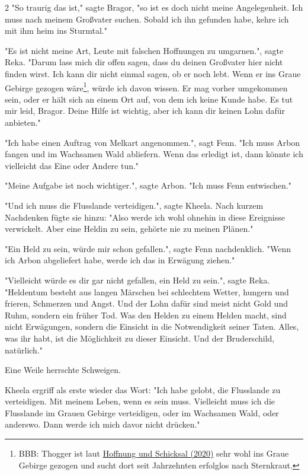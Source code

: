 \documentclass[10pt, a4paper, oneside]{book}
\begin{document}
\begin{multicols}{2}
"So traurig das ist," sagte Bragor, "so ist es doch nicht meine Angelegenheit. Ich muss nach meinem Großvater suchen. Sobald ich ihn gefunden habe, kehre ich mit ihm heim ins Sturmtal." 

"Es ist nicht meine Art, Leute mit falschen Hoffnungen zu umgarnen.", sagte Reka. "Darum lass mich dir offen sagen, dass du deinen Großvater hier nicht finden wirst. Ich kann dir nicht einmal sagen, ob er noch lebt. Wenn er ins Graue Gebirge gezogen wäre\footnote{BBB: Thogger ist laut \hyperref[storytext-2020-hoffnung-und-schicksal]{Hoffnung und Schicksal (2020)} sehr wohl ins Graue Gebirge gezogen und sucht dort seit Jahrzehnten erfolglos nach Sternkraut.}, würde ich davon wissen. Er mag vorher umgekommen sein, oder er hält sich an einem Ort auf, von dem ich keine Kunde habe. Es tut mir leid, Bragor. Deine Hilfe ist wichtig, aber ich kann dir keinen Lohn dafür anbieten." 

"Ich habe einen Auftrag von Melkart angenommen.", sagt Fenn. "Ich muss Arbon fangen und im Wachsamen Wald abliefern. Wenn das erledigt ist, dann könnte ich vielleicht das Eine oder Andere tun." 

"Meine Aufgabe ist noch wichtiger.", sagte Arbon. "Ich muss Fenn entwischen." 

"Und ich muss die Flusslande verteidigen.", sagte Kheela. Nach kurzem Nachdenken fügte sie hinzu: "Also werde ich wohl ohnehin in diese Ereignisse verwickelt. Aber eine Heldin zu sein, gehörte nie zu meinen Plänen." 

"Ein Held zu sein, würde mir schon gefallen.", sagte Fenn nachdenklich. "Wenn ich Arbon abgeliefert habe, werde ich das in Erwägung ziehen." 

"Vielleicht würde es dir gar nicht gefallen, ein Held zu sein.", sagte Reka. "Heldentum besteht aus langen Märschen bei schlechtem Wetter, hungern und frieren, Schmerzen und Angst. Und der Lohn dafür sind meist nicht Gold und Ruhm, sondern ein früher Tod. Was den Helden zu einem Helden macht, sind nicht Erwägungen, sondern die Einsicht in die Notwendigkeit seiner Taten. Alles, was ihr habt, ist die Möglichkeit zu dieser Einsicht. Und der Bruderschild, natürlich." 

Eine Weile herrschte Schweigen. 

Kheela ergriff als erste wieder das Wort: "Ich habe gelobt, die Flusslande zu verteidigen. Mit meinem Leben, wenn es sein muss. Vielleicht muss ich die Flusslande im Grauen Gebirge verteidigen, oder im Wachsamen Wald, oder anderswo. Dann werde ich mich davor nicht drücken." 


\end{multicols}
\end{document}
